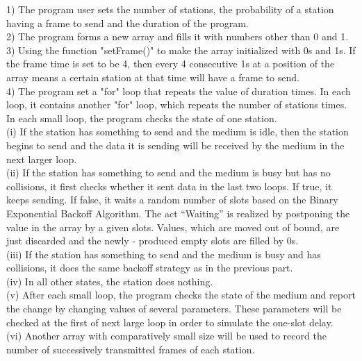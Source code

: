 \documentclass[11pt,a4paper]{report}
\begin{document}
1) The program user sets the number of stations, the probability of a station having a frame to send and the duration of the program. \\
2) The program forms a new array and fills it with numbers other than 0 and 1. \\
3) Using the function "setFrame()" to make the array initialized with 0s and 1s. If the frame time is set to be 4, then every 4 consecutive 1s at a position of the array means a certain station at that time will have a frame to send. \\
4) The program set a "for" loop that repeats the value of duration times. In each loop, it contains another "for" loop, which repeats the number of stations times. In each small loop, the program checks the state of one station. \\
(i) If the station has something to send and the medium is idle, then the station begins to send and the data it is sending will be received by the medium in the next larger loop. \\
(ii) If the station has something to send and the medium is busy but has no collisions, it first checks whether it sent data in the last two loops. If true, it keeps sending. If false, it waits a random number of slots based on the Binary Exponential Backoff Algorithm. The act “Waiting” is realized by postponing the value in the array by a given slots. Values, which are moved out of bound, are just discarded and the newly - produced empty slots are filled by 0s. \\
(iii) If the station has something to send and the medium is busy and has collisions, it does the same backoff strategy as in the previous part. \\
(iv) In all other states, the station does nothing. \\
(v) After each small loop, the program checks the state of the medium and report the change by changing values of several parameters. These parameters will be checked at the first of next large loop in order to simulate the one-slot delay. \\
(vi) Another array with comparatively small size will be used to record the number of successively transmitted frames of each station.
\end{document}
